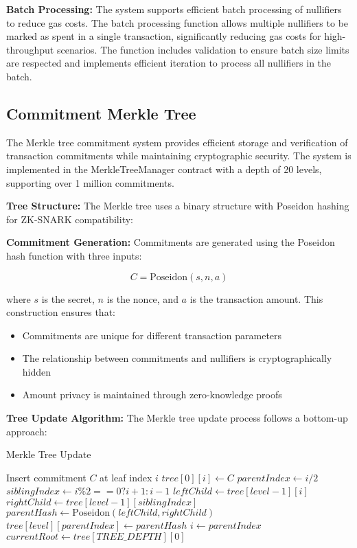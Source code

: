 \documentclass[11pt,a4paper]{article}
\begin{document}
\textbf{Batch Processing:}
The system supports efficient batch processing of nullifiers to reduce gas costs. The batch processing function allows multiple nullifiers to be marked as spent in a single transaction, significantly reducing gas costs for high-throughput scenarios. The function includes validation to ensure batch size limits are respected and implements efficient iteration to process all nullifiers in the batch.

\subsection{Commitment Merkle Tree}

The Merkle tree commitment system provides efficient storage and verification of transaction commitments while maintaining cryptographic security. The system is implemented in the MerkleTreeManager contract with a depth of 20 levels, supporting over 1 million commitments.

\textbf{Tree Structure:}
The Merkle tree uses a binary structure with Poseidon hashing for ZK-SNARK compatibility:


\textbf{Commitment Generation:}
Commitments are generated using the Poseidon hash function with three inputs:

\begin{equation}
C = \text{Poseidon}(s, n, a)
\end{equation}

where $s$ is the secret, $n$ is the nonce, and $a$ is the transaction amount. This construction ensures that:
\begin{itemize}
    \item Commitments are unique for different transaction parameters
    \item The relationship between commitments and nullifiers is cryptographically hidden
    \item Amount privacy is maintained through zero-knowledge proofs
\end{itemize}

\textbf{Tree Update Algorithm:}
The Merkle tree update process follows a bottom-up approach:

\begin{algorithm}
\caption{Merkle Tree Update}
\begin{algorithmic}[1]
\STATE Insert commitment $C$ at leaf index $i$
\STATE $tree[0][i] \leftarrow C$
    \STATE $parentIndex \leftarrow i / 2$
    \STATE $siblingIndex \leftarrow i \% 2 == 0 ? i + 1 : i - 1$
    \STATE $leftChild \leftarrow tree[level-1][i]$
    \STATE $rightChild \leftarrow tree[level-1][siblingIndex]$
    \STATE $parentHash \leftarrow \text{Poseidon}(leftChild, rightChild)$
    \STATE $tree[level][parentIndex] \leftarrow parentHash$
    \STATE $i \leftarrow parentIndex$
\ENDFOR
\STATE $currentRoot \leftarrow tree[TREE\_DEPTH][0]$
\end{algorithmic}
\end{algorithm}
\end{document}
